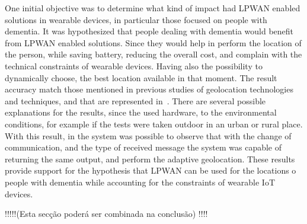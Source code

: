 One initial objective was to  determine what kind of impact had LPWAN enabled solutions in wearable devices, in particular those focused on people with dementia.\newline 
It was hypothesized that people dealing with dementia would benefit from LPWAN enabled solutions. Since they would help in perform the location of the person, while saving battery, reducing the overall cost, and complain with the technical constraints of wearable devices. Having also the possibility to dynamically choose, the best location available in that moment. \newline 
The result accuracy match those mentioned in previous studies of geolocation technologies and techniques, and that are represented in~.\newline 
There are several possible explanations for the results, since the used hardware, to the environmental conditions, for example if the tests were taken outdoor in an urban or rural place. \newline 
With this result, in the system  was possible to observe that with the change of communication, and the type of received message the system was capable of returning the same output, and perform the adaptive geolocation.\newline 
These results provide support for the hypothesis that LPWAN can be used for the locations o people with dementia while accounting for the constraints of wearable IoT devices.



!!!!!(Esta secção poderá ser combinada na conclusão) !!!!

